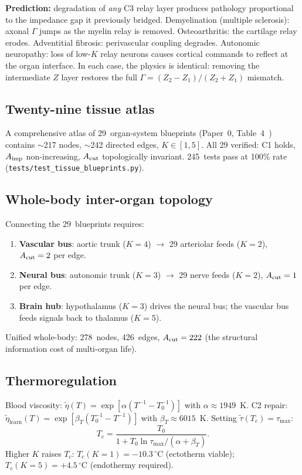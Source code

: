 \documentclass[aps,pre,twocolumn,superscriptaddress,floatfix]{revtex4-2}
\begin{document}
\begin{remark}
\textbf{Prediction:}
degradation of \emph{any} C3 relay layer produces
pathology proportional to the impedance gap it
previously bridged.
Demyelination (multiple sclerosis): axonal
$\Gamma$ jumps as the myelin relay is removed.
Osteoarthritis: the cartilage relay erodes.
Adventitial fibrosis: perivascular coupling
degrades.
Autonomic neuropathy: loss of low-$K$ relay
neurons causes cortical commands to reflect
at the organ interface.
In each case, the physics is identical:
removing the intermediate $Z$ layer restores
the full $\Gamma = (Z_2-Z_1)/(Z_2+Z_1)$ mismatch.
\end{remark}

\subsection{Twenty-nine tissue atlas}

A comprehensive atlas of 29~organ-system blueprints
(Paper~0, Table~4~\cite{Paper0}) contains $\sim$217
nodes, $\sim$242 directed edges, $K \in [1,5]$.
All 29 verified:  C1 holds, $A_{\text{imp}}$ non-increasing,
$A_{\text{cut}}$ topologically invariant.
245~tests pass at 100\% rate
(\texttt{tests/test\_tissue\_blueprints.py}).

\subsection{Whole-body inter-organ topology}

Connecting the 29~blueprints requires:
\begin{enumerate}
  \item \textbf{Vascular bus}: aortic trunk ($K=4$)
    $\to$ 29 arteriolar feeds ($K=2$),
    $A_{\text{cut}} = 2$ per edge.
  \item \textbf{Neural bus}: autonomic trunk ($K=3$)
    $\to$ 29 nerve feeds ($K=2$),
    $A_{\text{cut}} = 1$ per edge.
  \item \textbf{Brain hub}: hypothalamus ($K=3$)
    drives the neural bus; the vascular bus feeds
    signals back to thalamus ($K=5$).
\end{enumerate}
Unified whole-body: 278~nodes, 426~edges,
$A_{\text{cut}} = 222$ (the structural information cost of
multi-organ life).

\subsection{Thermoregulation}

Blood viscosity: $\tilde\eta(T) = \exp[\alpha(T^{-1}
- T_0^{-1})]$ with $\alpha \approx 1949$~K.
C2 repair:
$\tilde\eta_{\text{learn}}(T) = \exp[\beta_T(T_0^{-1}
- T^{-1})]$ with $\beta_T \approx 6015$~K.
Setting $\tilde\tau(T_c) = \tau_{\max}$:
\begin{equation}
  T_c = \frac{T_0}{1 + T_0\ln\tau_{\max}/
  (\alpha + \beta_T)}.
  \label{eq:Tc}
\end{equation}
Higher $K$ raises $T_c$:
$T_c(K{=}1) = -10.3\,^\circ$C (ectotherm viable);
$T_c(K{=}5) = +4.5\,^\circ$C (endothermy required).
\end{document}

